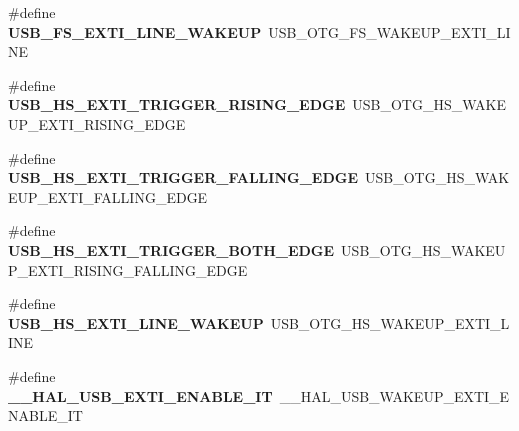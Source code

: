 \begin{DoxyCompactItemize}
\item 
\hypertarget{group___h_a_l___u_s_b___aliased___macros_ga9990232132734bde77e11c4f8d2e4163}{\#define {\bfseries U\-S\-B\-\_\-\-F\-S\-\_\-\-E\-X\-T\-I\-\_\-\-L\-I\-N\-E\-\_\-\-W\-A\-K\-E\-U\-P}~U\-S\-B\-\_\-\-O\-T\-G\-\_\-\-F\-S\-\_\-\-W\-A\-K\-E\-U\-P\-\_\-\-E\-X\-T\-I\-\_\-\-L\-I\-N\-E}\label{group___h_a_l___u_s_b___aliased___macros_ga9990232132734bde77e11c4f8d2e4163}

\item 
\hypertarget{group___h_a_l___u_s_b___aliased___macros_gabae8c431934cc5189524c41c4a413e5d}{\#define {\bfseries U\-S\-B\-\_\-\-H\-S\-\_\-\-E\-X\-T\-I\-\_\-\-T\-R\-I\-G\-G\-E\-R\-\_\-\-R\-I\-S\-I\-N\-G\-\_\-\-E\-D\-G\-E}~U\-S\-B\-\_\-\-O\-T\-G\-\_\-\-H\-S\-\_\-\-W\-A\-K\-E\-U\-P\-\_\-\-E\-X\-T\-I\-\_\-\-R\-I\-S\-I\-N\-G\-\_\-\-E\-D\-G\-E}\label{group___h_a_l___u_s_b___aliased___macros_gabae8c431934cc5189524c41c4a413e5d}

\item 
\hypertarget{group___h_a_l___u_s_b___aliased___macros_gacf7c7cd4c0acdaef836d1381884eafdc}{\#define {\bfseries U\-S\-B\-\_\-\-H\-S\-\_\-\-E\-X\-T\-I\-\_\-\-T\-R\-I\-G\-G\-E\-R\-\_\-\-F\-A\-L\-L\-I\-N\-G\-\_\-\-E\-D\-G\-E}~U\-S\-B\-\_\-\-O\-T\-G\-\_\-\-H\-S\-\_\-\-W\-A\-K\-E\-U\-P\-\_\-\-E\-X\-T\-I\-\_\-\-F\-A\-L\-L\-I\-N\-G\-\_\-\-E\-D\-G\-E}\label{group___h_a_l___u_s_b___aliased___macros_gacf7c7cd4c0acdaef836d1381884eafdc}

\item 
\hypertarget{group___h_a_l___u_s_b___aliased___macros_ga88242c33988234109ab398a9195f6c11}{\#define {\bfseries U\-S\-B\-\_\-\-H\-S\-\_\-\-E\-X\-T\-I\-\_\-\-T\-R\-I\-G\-G\-E\-R\-\_\-\-B\-O\-T\-H\-\_\-\-E\-D\-G\-E}~U\-S\-B\-\_\-\-O\-T\-G\-\_\-\-H\-S\-\_\-\-W\-A\-K\-E\-U\-P\-\_\-\-E\-X\-T\-I\-\_\-\-R\-I\-S\-I\-N\-G\-\_\-\-F\-A\-L\-L\-I\-N\-G\-\_\-\-E\-D\-G\-E}\label{group___h_a_l___u_s_b___aliased___macros_ga88242c33988234109ab398a9195f6c11}

\item 
\hypertarget{group___h_a_l___u_s_b___aliased___macros_ga76b8cf072166993b9e3094bb8c983265}{\#define {\bfseries U\-S\-B\-\_\-\-H\-S\-\_\-\-E\-X\-T\-I\-\_\-\-L\-I\-N\-E\-\_\-\-W\-A\-K\-E\-U\-P}~U\-S\-B\-\_\-\-O\-T\-G\-\_\-\-H\-S\-\_\-\-W\-A\-K\-E\-U\-P\-\_\-\-E\-X\-T\-I\-\_\-\-L\-I\-N\-E}\label{group___h_a_l___u_s_b___aliased___macros_ga76b8cf072166993b9e3094bb8c983265}

\item 
\hypertarget{group___h_a_l___u_s_b___aliased___macros_ga8c010632fff5661d2424e4a656216044}{\#define {\bfseries \-\_\-\-\_\-\-H\-A\-L\-\_\-\-U\-S\-B\-\_\-\-E\-X\-T\-I\-\_\-\-E\-N\-A\-B\-L\-E\-\_\-\-I\-T}~\-\_\-\-\_\-\-H\-A\-L\-\_\-\-U\-S\-B\-\_\-\-W\-A\-K\-E\-U\-P\-\_\-\-E\-X\-T\-I\-\_\-\-E\-N\-A\-B\-L\-E\-\_\-\-I\-T}\label{group___h_a_l___u_s_b___aliased___macros_ga8c010632fff5661d2424e4a656216044}


\end{DoxyCompactItemize}
